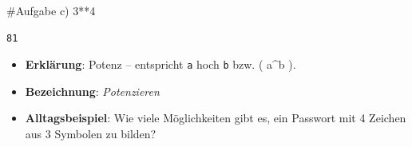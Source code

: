 \documentclass[
  11pt,
  a4paper,
  DIV=11,
  numbers=noendperiod]{scrartcl}
\newenvironment{Shaded}{\begin{snugshade}}{\end{snugshade}}
\newcommand{\CommentTok}[1]{\textcolor[rgb]{0.37,0.37,0.37}{#1}}
\newcommand{\DecValTok}[1]{\textcolor[rgb]{0.68,0.00,0.00}{#1}}
\newcommand{\OperatorTok}[1]{\textcolor[rgb]{0.37,0.37,0.37}{#1}}
\providecommand{\tightlist}{%
  \setlength{\itemsep}{0pt}\setlength{\parskip}{0pt}}\usepackage{longtable,booktabs,array}
\begin{document}
\begin{Shaded}
\begin{Highlighting}[numbers=left,,]
\CommentTok{\#Aufgabe c)}
\DecValTok{3}\OperatorTok{**}\DecValTok{4}
\end{Highlighting}
\end{Shaded}

\begin{verbatim}
81
\end{verbatim}

\begin{itemize}
\tightlist
\item
  \textbf{Erklärung}: Potenz -- entspricht \texttt{a} hoch \texttt{b}
  bzw. ( a\^{}b ).
\item
  \textbf{Bezeichnung}: \emph{Potenzieren}
\item
  \textbf{Alltagsbeispiel}: Wie viele Möglichkeiten gibt es, ein
  Passwort mit 4 Zeichen aus 3 Symbolen zu bilden?
\end{itemize}
\end{document}
